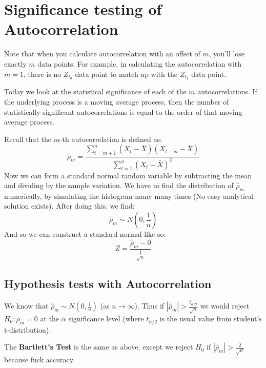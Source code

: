 \section{Significance testing of Autocorrelation}
Note that when you calculate autocorrelation with an offset of $m$, you'll lose
exactly $m$ data points. For example, in calculating the autocorrelation with
$m=1$, there is no $Z_{t_0}$ data point to match up with the  $Z_{t_1}$ data
point.

Today we look at the statistical significance of each of the $m$
autocorrelations. If the underlying process is a moving average process, then
the number of statistically significant autocorrelations is equal to the order
of that moving average process.

Recall that the $m$-th autocorrelation is defined as:
\begin{equation*}
    \hat{\rho}_m = \frac{
        \sum_{t=m+1}^{n} \left( X_t - \bar{X} \right) \left( X_{t-m} - \bar{X} \right)
        }{
        \sum_{t=1}^{n} \left( X_t - \bar{X}\right)^2
        }
\end{equation*}
Now we can form a standard normal random variable by subtracting the mean and
dividing by the sample variation. We have to find the distribution of
$\hat{\rho}_m$ numerically, by simulating the histogram many many times (No
easy analytical solution exists). After doing this, we find:
\begin{equation*}
    \hat{\rho}_m \sim N(0, \frac{1}{n})
\end{equation*}
And so we can construct a standard normal like so:
\begin{equation*}
    Z = \frac{\hat{\rho}_m - 0}{\frac{1}{\sqrt{n}}}
\end{equation*}

\subsection{Hypothesis tests with Autocorrelation}
We know that $\hat{\rho}_m \sim N(0, \frac{1}{n})$ (as $n\to\infty$).  Thus if
$|\hat{\rho}_m| > \frac{t_{\alpha/2}}{\sqrt{n}}$ we would reject $H_0: \rho_m =
0$ at the  $\alpha$ significance level (where $t_{\alpha/2}$ is the usual value
from student's t-distribution).

The \textbf{Bartlett's Test} is the same as above, except we reject $H_0$ if
$|\hat{\rho}_m| > \frac{2}{\sqrt{n}}$ because fuck accuracy.


